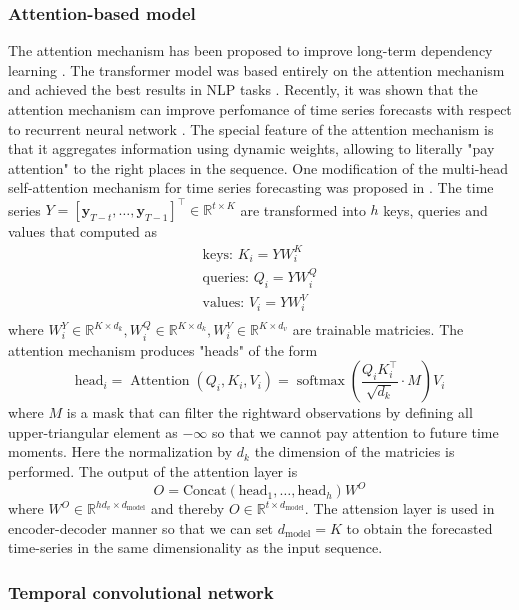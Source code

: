 \documentclass[12pt,a4paper]{article}
\begin{document}
\subsubsection{Attention-based model}

The attention mechanism has been proposed to improve long-term dependency learning \cite{bahdanau2016neural}. The transformer model was based entirely on the attention mechanism and achieved the best results in NLP tasks \cite{vaswani2017attention}. Recently, it was shown that the attention mechanism can improve perfomance of time series forecasts with respect to recurrent neural network \cite{tsdeeplearning2021}. The special feature of the attention mechanism is that it aggregates information using dynamic weights, allowing to literally "pay attention" to the right places in the sequence. One modification of the multi-head self-attention mechanism for time series forecasting was proposed in \cite{normflow2021}. The time series $Y = [\mathbf y_{T-t}, \dots, \mathbf y_{T-1}]^\top \in \mathbb R^{t \times K}$ are transformed into $h$ keys, queries and values that computed as
$$
\begin{aligned}
\text{keys: } K_i = Y W_i^K \\
\text{queries: } Q_i = Y W_i^Q \\
\text{values: } V_i = Y W_i^V \\
\end{aligned}
$$
where $W_i^Y \in \mathbb R^{K \times d_k}, W_i^Q \in \mathbb R^{K \times d_k}, W_i^V \in \mathbb R^{K \times d_v}$ are trainable matricies. The attention mechanism produces "heads" of the form
$$
\text{head}_i=\operatorname{Attention}\left(Q_i, K_i, V_i\right)=\operatorname{softmax}\left(\frac{Q_i K_i^{\top}}{\sqrt{d_{k}}} \cdot M\right) V_i
$$
where $M$ is a mask that can filter the rightward observations by defining all upper-triangular element as $-\infty$ so that we cannot pay attention to future time moments. Here the normalization by $d_k$ the dimension of the matricies is performed. The output of the attention layer is
$$O = \text {Concat}\left(\text{head}_{1}, \ldots, \text {head}_{h}\right) W^{O}$$
where $W^O \in \mathbb R^{hd_v \times d_\text{model}}$ and thereby $O \in \mathbb R^{t \times d_\text{model}}$. The attension layer is used in encoder-decoder manner so that we can set $d_\text{model} = K$ to obtain the forecasted time-series in the same dimensionality as the input sequence.

\subsubsection{Temporal convolutional network}
\end{document}
